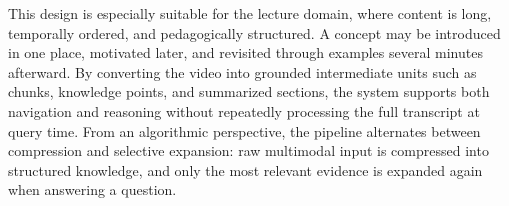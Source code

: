This design is especially suitable for the lecture domain, where content is long, temporally ordered, and pedagogically structured. A concept may be introduced in one place, motivated later, and revisited through examples several minutes afterward. By converting the video into grounded intermediate units such as chunks, knowledge points, and summarized sections, the system supports both navigation and reasoning without repeatedly processing the full transcript at query time. From an algorithmic perspective, the pipeline alternates between compression and selective expansion: raw multimodal input is compressed into structured knowledge, and only the most relevant evidence is expanded again when answering a question.
